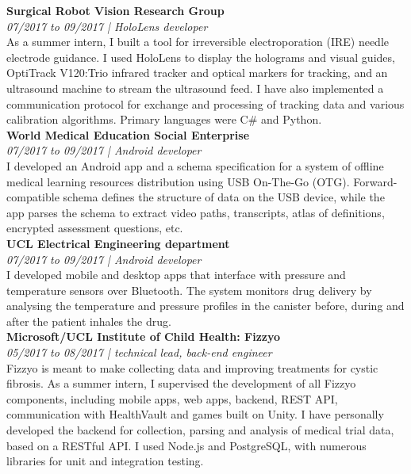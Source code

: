 \documentclass{article}
\begin{document}
\begin{multicols}{2}
\textbf{Surgical Robot Vision Research Group} \\
\emph{\color{gray}07/2017 to 09/2017 | HoloLens developer} \\
As a summer intern, I built a tool for irreversible electroporation (IRE) needle electrode guidance. I used HoloLens to display the holograms and visual guides, OptiTrack V120:Trio infrared tracker and optical markers for tracking, and an ultrasound machine to stream the ultrasound feed. I have also implemented a communication protocol for exchange and processing of tracking data and various calibration algorithms. Primary languages were C\# and Python.
\vspace{2mm}
\\
\textbf{World Medical Education Social Enterprise} \\
\emph{\color{gray}07/2017 to 09/2017 | Android developer} \\
I developed an Android app and a schema specification for a system of offline medical learning resources distribution using USB On-The-Go (OTG). Forward-compatible schema defines the structure of data on the USB device, while the app parses the schema to extract video paths, transcripts, atlas of definitions, encrypted assessment questions, etc.
\vspace{2mm}
\\
\textbf{UCL Electrical Engineering department} \\
\emph{\color{gray}07/2017 to 09/2017 | Android developer} \\
I developed mobile and desktop apps that interface with pressure and temperature sensors over Bluetooth. The system monitors drug delivery by analysing the temperature and pressure profiles in the canister before, during and after the patient inhales the drug.
\vspace{2mm}
\\
\textbf{Microsoft/UCL Institute of Child Health: Fizzyo} \\
\emph{\color{gray} 05/2017 to 08/2017 | technical lead, back-end engineer} \\
Fizzyo is meant to make collecting data and improving treatments for cystic fibrosis. As a summer intern, I supervised the development of all Fizzyo components, including mobile apps, web apps, backend, REST API, communication with HealthVault and games built on Unity. I have personally developed the backend for collection, parsing and analysis of medical trial data, based on a RESTful API. I used Node.js and PostgreSQL, with numerous libraries for unit and integration testing.

\end{multicols}
\end{document}
